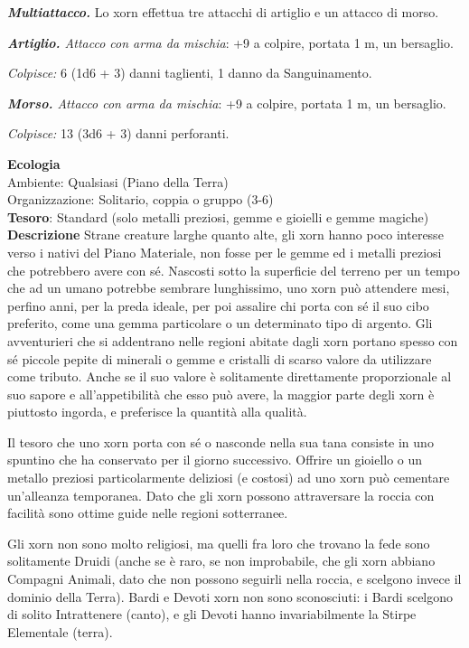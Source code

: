 \begin{multicols}{2}
	\textit{\textbf{Multiattacco.}} Lo xorn effettua tre attacchi di artiglio e un attacco di morso.

	\textit{\textbf{Artiglio.} Attacco con arma da mischia}: +9 a colpire, portata 1 m, un bersaglio.

	\textit{Colpisce:} 6 (1d6 + 3) danni taglienti, 1 danno da Sanguinamento.

	\textit{\textbf{Morso.} Attacco con arma da mischia}: +9 a colpire, portata 1 m, un bersaglio.

	\textit{Colpisce:} 13 (3d6 + 3) danni perforanti.

	\textbf{Ecologia}\\
	Ambiente: Qualsiasi (Piano della Terra)\\
	Organizzazione: Solitario, coppia o gruppo (3-6)\\
	\textbf{Tesoro}: Standard (solo metalli preziosi, gemme e gioielli e gemme magiche)\\
	\textbf{Descrizione}
	Strane creature larghe quanto alte, gli xorn hanno poco interesse verso i nativi del Piano Materiale, non fosse per le gemme ed i metalli preziosi che potrebbero avere con sé. Nascosti sotto la superficie del terreno per un tempo che ad un umano potrebbe sembrare lunghissimo, uno xorn può attendere mesi, perfino anni, per la preda ideale, per poi assalire chi porta con sé il suo cibo preferito, come una gemma particolare o un determinato tipo di argento. Gli avventurieri che si addentrano nelle regioni abitate dagli xorn portano spesso con sé piccole pepite di minerali o gemme e cristalli di scarso valore da utilizzare come tributo. Anche se il suo valore è solitamente direttamente proporzionale al suo sapore e all'appetibilità che esso può avere, la maggior parte degli xorn è piuttosto ingorda, e preferisce la quantità alla qualità.

	Il tesoro che uno xorn porta con sé o nasconde nella sua tana consiste in uno spuntino che ha conservato per il giorno successivo. Offrire un gioiello o un metallo preziosi particolarmente deliziosi (e costosi) ad uno xorn può cementare un'alleanza temporanea. Dato che gli xorn possono attraversare la roccia con facilità sono ottime guide nelle regioni sotterranee.

	Gli xorn non sono molto religiosi, ma quelli fra loro che trovano la fede sono solitamente Druidi (anche se è raro, se non improbabile, che gli xorn abbiano Compagni Animali, dato che non possono seguirli nella roccia, e scelgono invece il dominio della Terra). Bardi e Devoti xorn non sono sconosciuti: i Bardi scelgono di solito Intrattenere (canto), e gli Devoti hanno invariabilmente la Stirpe Elementale (terra).



\end{multicols}
